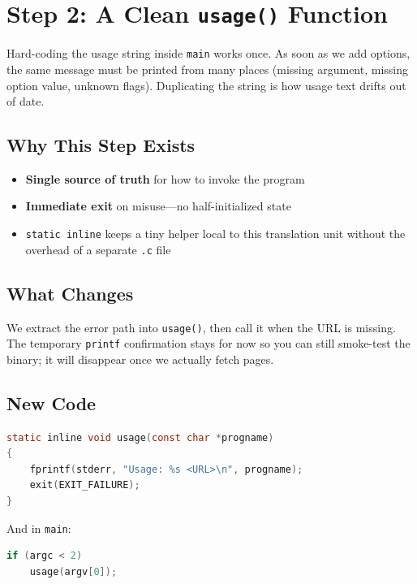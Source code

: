 \section{Step 2: A Clean \texttt{usage()} Function}

Hard-coding the usage string inside \texttt{main} works once. As soon as we
add options, the same message must be printed from many places (missing
argument, missing option value, unknown flags). Duplicating the string is how
usage text drifts out of date.

\subsection{Why This Step Exists}

\begin{itemize}[leftmargin=1.4em]
    \item \textbf{Single source of truth} for how to invoke the program
    \item \textbf{Immediate exit} on misuse---no half-initialized state
    \item \texttt{static inline} keeps a tiny helper local to this translation
          unit without the overhead of a separate \texttt{.c} file
\end{itemize}

\subsection{What Changes}

We extract the error path into \texttt{usage()}, then call it when the URL is
missing. The temporary \texttt{printf} confirmation stays for now so you can
still smoke-test the binary; it will disappear once we actually fetch pages.

\subsection{New Code}

\begin{lstlisting}[style=snippet,language=C]
static inline void usage(const char *progname)
{
    fprintf(stderr, "Usage: %s <URL>\n", progname);
    exit(EXIT_FAILURE);
}
\end{lstlisting}

And in \texttt{main}:

\begin{lstlisting}[style=snippet,language=C]
if (argc < 2)
    usage(argv[0]);
\end{lstlisting}

